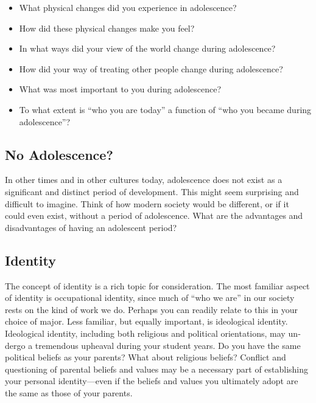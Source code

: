 \documentclass[
]{book}
\providecommand{\tightlist}{%
  \setlength{\itemsep}{0pt}\setlength{\parskip}{0pt}}
\begin{document}
\begin{itemize}
\tightlist
\item
  What physical changes did you experience in adolescence?\\
\item
  How did these physical changes make you feel?\\
\item
  In what ways did your view of the world change during adolescence?\\
\item
  How did your way of treating other people change during adolescence?\\
\item
  What was most important to you during adolescence?\\
\item
  To what extent is ``who you are today'' a function of ``who you became during adolescence''?
\end{itemize}

\hypertarget{no-adolescence}{%
\subsection*{No Adolescence?}\label{no-adolescence}}

In other times and in other cultures to­day, adolescence does not exist as a significant and distinct period of develop­ment. This might seem surprising and difficult to imagine. Think of how modern society would be different, or if it could even exist, without a period of adolescence. What are the advantages and disadvantages of having an adolescent period?

\hypertarget{identity}{%
\subsection*{Identity}\label{identity}}

The concept of identity is a rich topic for consideration. The most familiar aspect of identity is occupational identity, since much of ``who we are'' in our society rests on the kind of work we do. Perhaps you can readily relate to this in your choice of major. Less familiar, but equally important, is ideological identity. Ideologi­cal identity, including both religious and political orientations, may un­dergo a tremen­dous upheaval during your student years. Do you have the same political beliefs as your parents? What about religious beliefs? Conflict and questioning of parental beliefs and values may be a necessary part of establishing your personal iden­tity---even if the beliefs and values you ultimately adopt are the same as those of your parents.
\end{document}
